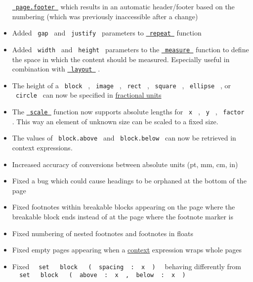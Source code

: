 \begin{itemize}
  \href{/docs/reference/layout/page/\#parameters-footer}{\texttt{\ page.footer\ }}
  which results in an automatic header/footer based on the numbering
  (which was previously inaccessible after a change)
\item
  Added \texttt{\ gap\ } and \texttt{\ justify\ } parameters to
  \href{/docs/reference/layout/repeat/}{\texttt{\ repeat\ }} function
\item
  Added \texttt{\ width\ } and \texttt{\ height\ } parameters to the
  \href{/docs/reference/layout/measure/}{\texttt{\ measure\ }} function
  to define the space in which the content should be measured.
  Especially useful in combination with
  \href{/docs/reference/layout/layout/}{\texttt{\ layout\ }} .
\item
  The height of a \texttt{\ block\ } , \texttt{\ image\ } ,
  \texttt{\ rect\ } , \texttt{\ square\ } , \texttt{\ ellipse\ } , or
  \texttt{\ circle\ } can now be specified in
  \href{/docs/reference/layout/fraction/}{fractional units}
\item
  The \href{/docs/reference/layout/scale/}{\texttt{\ scale\ }} function
  now supports absolute lengths for \texttt{\ x\ } , \texttt{\ y\ } ,
  \texttt{\ factor\ } . This way an element of unknown size can be
  scaled to a fixed size.
\item
  The values of \texttt{\ block.above\ } and \texttt{\ block.below\ }
  can now be retrieved in context expressions.
\item
  Increased accuracy of conversions between absolute units (pt, mm, cm,
  in)
\item
  Fixed a bug which could cause headings to be orphaned at the bottom of
  the page
\item
  Fixed footnotes within breakable blocks appearing on the page where
  the breakable block ends instead of at the page where the footnote
  marker is
\item
  Fixed numbering of nested footnotes and footnotes in floats
\item
  Fixed empty pages appearing when a
  \href{/docs/reference/context/}{context} expression wraps whole pages
\item
  Fixed
  \texttt{\ }{\texttt{\ set\ }}\texttt{\ }{\texttt{\ block\ }}\texttt{\ }{\texttt{\ (\ }}\texttt{\ spacing\ }{\texttt{\ :\ }}\texttt{\ x\ }{\texttt{\ )\ }}\texttt{\ }
  behaving differently from
  \texttt{\ }{\texttt{\ set\ }}\texttt{\ }{\texttt{\ block\ }}\texttt{\ }{\texttt{\ (\ }}\texttt{\ above\ }{\texttt{\ :\ }}\texttt{\ x\ }{\texttt{\ ,\ }}\texttt{\ below\ }{\texttt{\ :\ }}\texttt{\ x\ }{\texttt{\ )\ }}\texttt{\ }

\end{itemize}
